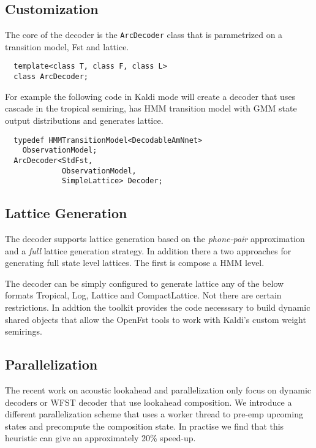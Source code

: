 \documentclass{article}
\begin{document}
\begin{itemize}
\subsection{Customization}
\label{sec:custom}
The core of the decoder is the \texttt{ArcDecoder} class that is parametrized on a transition
model, Fst  and lattice.
\begin{verbatim}
  template<class T, class F, class L>
  class ArcDecoder;
\end{verbatim}

For example the following code in Kaldi mode will create a decoder that uses
cascade in the tropical semiring, has HMM transition model with GMM state 
output distributions and generates lattice.

\begin{verbatim}
  typedef HMMTransitionModel<DecodableAmNnet> 
    ObservationModel;
  ArcDecoder<StdFst,         
             ObservationModel,
             SimpleLattice> Decoder;
\end{verbatim}

\subsection{Lattice Generation}
The decoder supports lattice generation based on the \emph{phone-pair}
approximation and a \emph{full} lattice generation strategy. In addition 
there a two approaches for generating full state level lattices. The first
is compose a HMM level.

The decoder can be simply configured to generate lattice any of the below formats
Tropical, Log, Lattice and CompactLattice. Not there are certain restrictions.
In addtion the toolkit provides the code necesssary to build dynamic shared objects
that allow the OpenFst tools to work with Kaldi's custom weight semirings.

\subsection{Parallelization}
The recent work on acoustic lookahead and parallelization only focus on dynamic decoders
or WFST decoder that use lookahead composition. We introduce a different parallelization
scheme that uses a worker thread to pre-emp upcoming states and precompute the composition
state. In practise we find that this heuristic can give an approximately 20\% speed-up.


\end{itemize}
\end{document}
